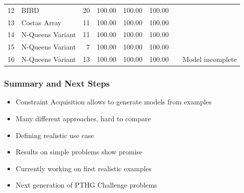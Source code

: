 \begin{frame}
{\begin{tabular}{llrrrrrl}
12 & BIBD & 20& \cellcolor{insight-lime!20} 100.00 &\cellcolor{insight-lime!20} 100.00 &\cellcolor{insight-lime!10} 100.00 & \cellcolor{insight-lime!10}\\
13 & Costas Array & 11& \cellcolor{insight-lime!20} 100.00 &\cellcolor{insight-lime!20} 100.00 &\cellcolor{insight-lime!10} 100.00 & \cellcolor{insight-lime!10}\\
14 & N-Queens Variant & 11& \cellcolor{insight-lime!20} 100.00 &\cellcolor{insight-lime!20} 100.00 &\cellcolor{insight-lime!10} 100.00 & \cellcolor{insight-lime!10}\\
15 & N-Queens Variant & 7& \cellcolor{insight-lime!20} 100.00 &\cellcolor{insight-lime!20} 100.00 &\cellcolor{insight-lime!10} 100.00 & \cellcolor{insight-lime!10}\\
16 & N-Queens Variant & 13& \cellcolor{insight-lime!20} 100.00 &\cellcolor{insight-lime!20} 100.00 &\cellcolor{insight-lime!10} 100.00 & \cellcolor{insight-burntorange} & Model incomplete\\
\bottomrule
\end{tabular}
}
\end{frame}


\begin{frame}
\frametitle{Summary and Next Steps}
\begin{itemize}
\item Constraint Acquisition allows to generate models from examples
\item Many different approaches, hard to compare
\item Defining realistic use case
\item Results on simple problems show promise
\item Currently working on first realistic examples
\item Next generation of PTHG Challenge problems
\end{itemize}
\end{frame}



